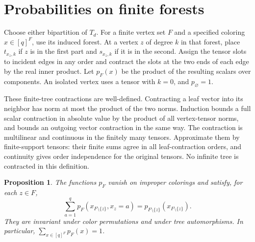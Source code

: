 \documentclass[11pt]{amsart}
\newtheorem{proposition}[theorem]{Proposition}
\begin{document}
\section{Probabilities on finite forests}\label{sec:finite}

Choose either bipartition of $T_d$. For a finite vertex set $F$ and a specified
coloring $x\in[q]^F$, use its induced forest. At a vertex $z$ of degree $k$
in that forest, place $t_{x_z,k}$ if $z$ is in the first part and $s_{x_z,k}$
if it is in the second. Assign the tensor slots to incident edges in any
order and contract the slots at the two ends of each edge by the real inner
product. Let $p_F(x)$ be the product of the resulting scalars over components.
An isolated vertex uses a tensor with $k=0$, and $p_\varnothing=1$.

These finite-tree contractions are well-defined. Contracting a leaf vector
into its neighbor has norm at most the product of the two norms. Induction
bounds a full scalar contraction in absolute value by the product of all
vertex-tensor norms, and bounds an outgoing vector contraction in the same
way. The contraction is multilinear and continuous in the finitely many
tensors. Approximate them by finite-support tensors: their finite sums agree
in all leaf-contraction orders, and continuity gives order independence for
the original tensors. No infinite tree is contracted in this definition.

\begin{proposition}\label{prop:consistency}
The functions $p_F$ vanish on improper colorings and satisfy, for each
$z\in F$,
\begin{equation}\label{eq:deletion}
\sum_{a=1}^q p_F(x_{F\setminus\{z\}},x_z=a)
=p_{F\setminus\{z\}}(x_{F\setminus\{z\}}).
\end{equation}
They are invariant under color permutations and under tree automorphisms.
In particular, $\sum_{x\in[q]^F}p_F(x)=1$.
\end{proposition}
\end{document}
